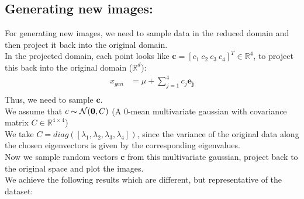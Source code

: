 \documentclass[11pt, fleqn]{article}
\begin{document}
\subsection*{Generating new images:}
For generating new images, we need to sample data in the reduced domain and then project it back into the original domain.\\
In the projected domain, each point looks like $\mathbf{c} = [c_1\  c_2\  c_3\  c_4]^T \in \mathbb{R}^4$, to project this back into the original domain ($\mathbb{R}^d$):
$$
\begin{aligned}
    x_{gen} &= \mu + \sum_{j=1}^{4}c_j\mathbf{e_j}\\
\end{aligned}
$$
Thus, we need to sample $\mathbf{c}$.\\
We assume that $c \thicksim \mathcal{N}(\mathbf{0}, C)$ (A 0-mean multivariate gaussian with covariance matrix $C \in \mathbb{R}^{4\times 4}$)\\
We take $C = diag([\lambda_1, \lambda_2, \lambda_3, \lambda_4])$, since the variance of the original data along the chosen eigenvectors is given by the corresponding eigenvalues.\\
Now we sample random vectors $\mathbf{c}$ from this multivariate gaussian, project back to the original space and plot the images.\\
We achieve the following results which are different, but representative of the dataset:
\end{document}
